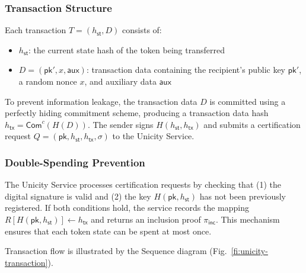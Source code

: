 \documentclass{article}
\newcommand{\pubkey}[0]{\mathsf{pk}}
\newcommand{\commitc}[0]{\mathsf{Com}^{c}}
\newcommand{\sthash}[0]{h_\mathsf{st}}
\newcommand{\txhash}[0]{h_\mathsf{tx}}
\newcommand{\auxd}[0]{\mathsf{aux}}
\newcommand{\pinc}[0]{\pi_{\mathsf{inc}}}
\begin{document}
\subsubsection{Transaction Structure}

Each transaction $T = (\sthash, D)$ consists of:
\begin{itemize}
\item $\sthash$: the current state hash of the token being transferred
\item $D = (\pubkey', x, \auxd)$: transaction data containing the recipient's public key $\pubkey'$, a random nonce $x$, and auxiliary data $\auxd$
\end{itemize}

\noindent To prevent information leakage, the transaction data $D$ is committed using a perfectly hiding commitment scheme, producing a transaction data hash $\txhash = \commitc(H(D))$. The sender signs $H(\sthash, \txhash)$ and submits a certification request $Q = (\pubkey, \sthash, \txhash, \sigma)$ to the Unicity Service.

\subsubsection{Double-Spending Prevention}

The Unicity Service processes certification requests by checking that (1) the digital signature is valid and (2) the key $H(\pubkey, \sthash)$ has not been previously registered. If both conditions hold, the service records the mapping $R[H(\pubkey, \sthash)] \gets \txhash$ and returns an inclusion proof $\pinc$. This mechanism ensures that each token state can be spent at most once.

Transaction flow is illustrated by the Sequence diagram (Fig.~\ref{fi:unicity-transaction}).
\end{document}
